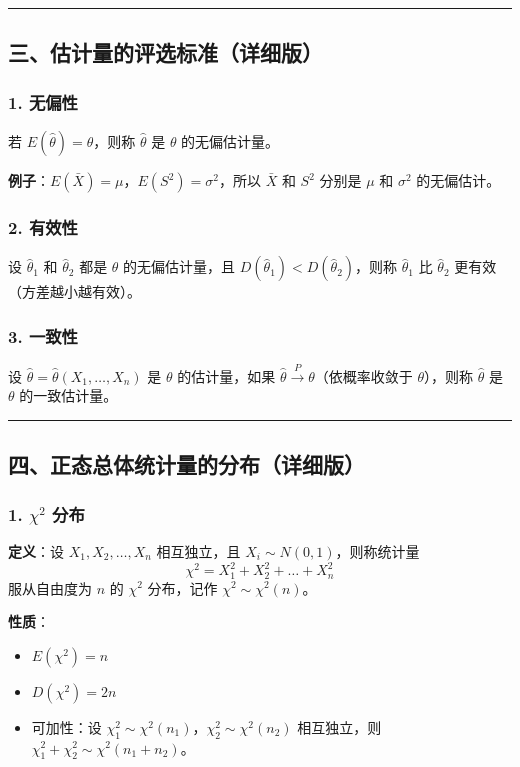 \documentclass[12pt,a4paper]{ctexart}
\begin{document}
\vspace{1em}\hrule\vspace{1em}

\subsection{三、估计量的评选标准（详细版）}

\subsubsection{1. 无偏性}
若 $E(\hat{\theta}) = \theta$，则称 $\hat{\theta}$ 是 $\theta$ 的无偏估计量。

\textbf{例子}：$E(\bar{X}) = \mu$，$E(S^2) = \sigma^2$，所以 $\bar{X}$ 和 $S^2$ 分别是 $\mu$ 和 $\sigma^2$ 的无偏估计。

\subsubsection{2. 有效性}
设 $\hat{\theta}_1$ 和 $\hat{\theta}_2$ 都是 $\theta$ 的无偏估计量，且 $D(\hat{\theta}_1) < D(\hat{\theta}_2)$，则称 $\hat{\theta}_1$ 比 $\hat{\theta}_2$ 更有效（方差越小越有效）。

\subsubsection{3. 一致性}
设 $\hat{\theta} = \hat{\theta}(X_1, \dots, X_n)$ 是 $\theta$ 的估计量，如果 $\hat{\theta} \xrightarrow{P} \theta$（依概率收敛于 $\theta$），则称 $\hat{\theta}$ 是 $\theta$ 的一致估计量。

\vspace{1em}\hrule\vspace{1em}

\subsection{四、正态总体统计量的分布（详细版）}

\subsubsection{1. $\chi^2$ 分布}
\textbf{定义}：设 $X_1, X_2, \dots, X_n$ 相互独立，且 $X_i \sim N(0, 1)$，则称统计量
\[ \chi^2 = X_1^2 + X_2^2 + \dots + X_n^2 \]
服从自由度为 $n$ 的 $\chi^2$ 分布，记作 $\chi^2 \sim \chi^2(n)$。

\textbf{性质}：
\begin{itemize}[noitemsep]
    \item $E(\chi^2) = n$
    \item $D(\chi^2) = 2n$
    \item 可加性：设 $\chi_1^2 \sim \chi^2(n_1)$，$\chi_2^2 \sim \chi^2(n_2)$ 相互独立，则 $\chi_1^2 + \chi_2^2 \sim \chi^2(n_1 + n_2)$。
\end{itemize}
\end{document}

